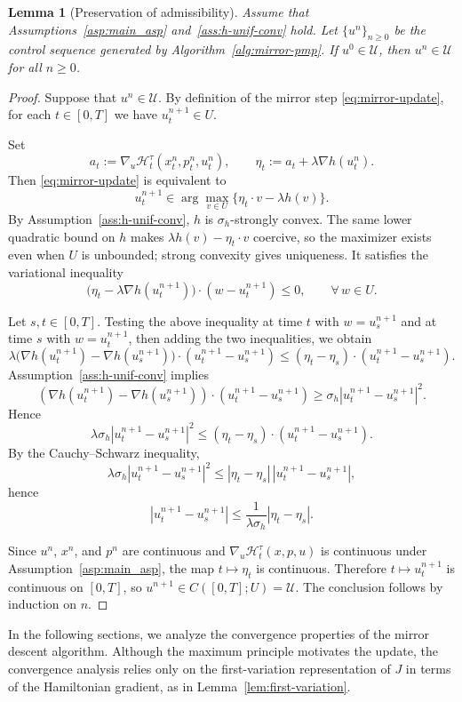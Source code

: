 \documentclass[11pt]{amsart}
\theoremstyle{plain}
\newtheorem{lemma}{Lemma}
\theoremstyle{definition}
\theoremstyle{remark}
\begin{document}
\begin{lemma}[Preservation of admissibility]
Assume that Assumptions~\ref{asp:main_asp} and~\ref{ass:h-unif-conv} hold. Let $\{u^n\}_{n\geq 0}$ be the control sequence generated by Algorithm~\ref{alg:mirror-pmp}. If $u^0 \in \mathcal U$, then $u^n \in \mathcal U$ for all $n \ge 0$.
\end{lemma}

\begin{proof}
Suppose that $u^n \in \mathcal{U}$. By definition of the mirror step \eqref{eq:mirror-update}, for each $t \in [0,T]$ we have
$u_t^{n+1} \in U$.

Set
\[
a_t := \nabla_u \mathcal H_t^\tau(x_t^n, p_t^n, u_t^n),
\qquad
\eta_t := a_t + \lambda \nabla h(u_t^n).
\]
Then \eqref{eq:mirror-update} is equivalent to
\[
u_t^{n+1} \in \arg\max_{v \in U} \bigl\{  \eta_t \cdot v - \lambda h(v) \bigr\}.
\]
By Assumption~\ref{ass:h-unif-conv}, $h$ is $\sigma_h$-strongly convex. The same lower quadratic bound on $h$ makes $\lambda h(v)-\eta_t\cdot v$ coercive, so the maximizer exists even when $U$ is unbounded; strong convexity gives uniqueness.
It satisfies the variational inequality
\[
\bigl( \eta_t - \lambda \nabla h(u_t^{n+1}) \bigr)\cdot (w - u_t^{n+1}) \le 0,
\qquad \forall\, w \in U.
\]

Let $s,t \in [0,T]$. Testing the above inequality at time $t$ with $w=u_s^{n+1}$ and at time $s$ with $w=u_t^{n+1}$, then adding the two inequalities, we obtain
\[
\lambda \bigl(\nabla h(u_t^{n+1}) - \nabla h(u_s^{n+1})\bigr)
\cdot (u_t^{n+1} - u_s^{n+1})
\le
(\eta_t - \eta_s)\cdot (u_t^{n+1} - u_s^{n+1}).
\]
Assumption~\ref{ass:h-unif-conv} implies
\[
(\nabla h(u_t^{n+1})-\nabla h(u_s^{n+1}))\cdot
(u_t^{n+1}-u_s^{n+1})
\ge \sigma_h |u_t^{n+1}-u_s^{n+1}|^2.
\]
Hence
\[
\lambda\sigma_h |u_t^{n+1}-u_s^{n+1}|^2
\le (\eta_t-\eta_s)\cdot (u_t^{n+1}-u_s^{n+1}).
\]
By the Cauchy--Schwarz inequality,
\[
\lambda\sigma_h |u_t^{n+1}-u_s^{n+1}|^2
\le |\eta_t-\eta_s|\,|u_t^{n+1}-u_s^{n+1}|,
\]
hence
\[
|u_t^{n+1} - u_s^{n+1}|
\le
\frac{1}{\lambda \sigma_h} |\eta_t - \eta_s|.
\]

Since $u^n$, $x^n$, and $p^n$ are continuous and $\nabla_u \mathcal H_t^\tau(x,p,u)$ is continuous under Assumption~\ref{asp:main_asp}, the map $t \mapsto \eta_t$ is continuous. Therefore $t \mapsto u_t^{n+1}$ is continuous on $[0,T]$, so $u^{n+1} \in C([0,T];U) = \mathcal U$. The conclusion follows by induction on $n$.
\end{proof}

In the following sections, we analyze the convergence properties of the mirror descent algorithm. Although the maximum principle motivates the update, the convergence analysis relies only on the first-variation representation of $J$ in terms of the Hamiltonian gradient, as in Lemma~\ref{lem:first-variation}.
\end{document}
